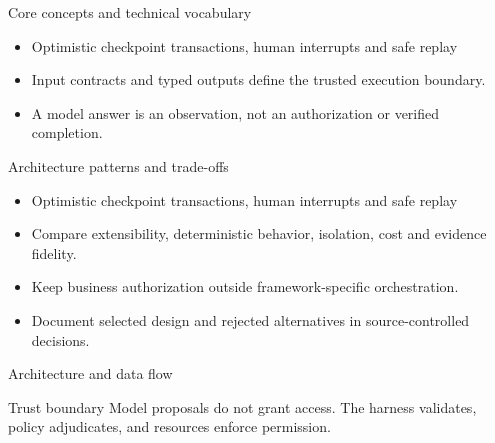 \documentclass[aspectratio=169,10pt]{beamer}
\begin{document}
\begin{frame}{Core concepts and technical vocabulary}
\small
\begin{itemize}
\item Optimistic checkpoint transactions, human interrupts and safe replay
\item Input contracts and typed outputs define the trusted execution boundary.
\item A model answer is an observation, not an authorization or verified completion.
\end{itemize}

\end{frame}

\begin{frame}{Architecture patterns and trade-offs}
\small
\begin{itemize}
\item Optimistic checkpoint transactions, human interrupts and safe replay
\item Compare extensibility, deterministic behavior, isolation, cost and evidence fidelity.
\item Keep business authorization outside framework-specific orchestration.
\item Document selected design and rejected alternatives in source-controlled decisions.
\end{itemize}

\end{frame}

\begin{frame}{Architecture and data flow}
\small
\centering
{}
\vspace{0.6cm}
\begin{block}{Trust boundary}
Model proposals do not grant access. The harness validates, policy adjudicates, and resources enforce permission.
\end{block}
\end{frame}
\end{document}
